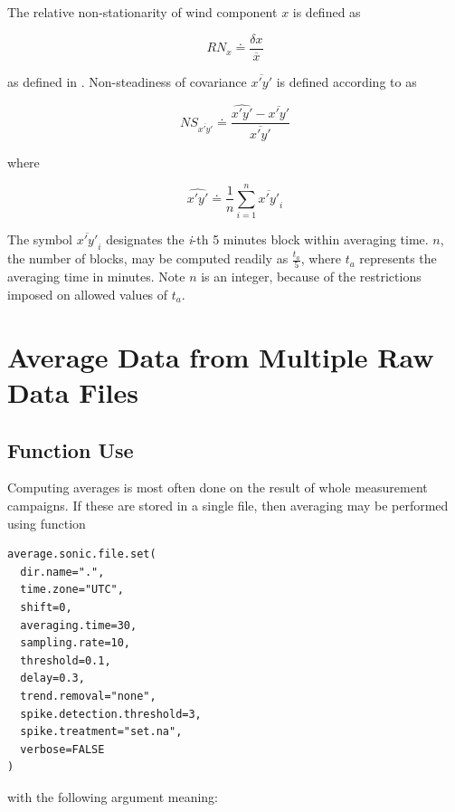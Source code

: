 \documentclass[a4paper,10pt]{book}
\begin{document}
The relative non-stationarity of wind component $x$ is defined as

\begin{equation}\label{eq:Relative Nonstationarity of X}
 RN_{x} \doteq \frac{\delta x}{\overline{x}}
\end{equation} 

\noindent as defined in \cite{Vickers1997}. Non-steadiness of covariance $\overline{x'y'}$ is defined according to \cite{Foken1996} as

\begin{equation}\label{eq:Non Steadiness of xy}
 NS_{\overline{x'y'}} \doteq \frac{\hat{x'y'} - \overline{x'y'}}{\overline{x'y'}}
\end{equation} 

\noindent where

\begin{equation}\label{eq:Partial Covariance}
 \hat{x'y'} \doteq \frac{1}{n} \sum_{i=1}^{n}\overline{x'y'}_i
\end{equation} 

The symbol $\overline{x'y'}_i$ designates the \emph{i}-th 5 minutes block within averaging time. $n$, the number of blocks, may be computed readily as $\frac{t_{a}}{5}$, where $t_{a}$ represents the averaging time in minutes. Note $n$ is an integer, because of the restrictions imposed on allowed values of $t_{a}$.


\section{Average Data from Multiple Raw Data Files}
\label{sec:Average Multiple Raw Data Files}

\subsection{Function Use}

Computing averages is most often done on the result of whole measurement campaigns. If these are stored in a single file, then averaging may be performed using function

\begin{verbatim}
average.sonic.file.set(
  dir.name=".",
  time.zone="UTC",
  shift=0,
  averaging.time=30,
  sampling.rate=10,
  threshold=0.1,
  delay=0.3,
  trend.removal="none",
  spike.detection.threshold=3,
  spike.treatment="set.na",
  verbose=FALSE
)
\end{verbatim} 

\noindent with the following argument meaning:
\end{document}

